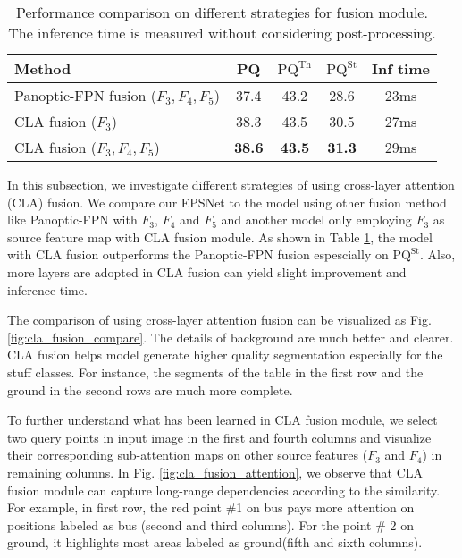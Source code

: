 \documentclass[runningheads]{llncs}
\begin{document}
    
\begin{table}[!tb]
\centering
    \caption{Performance comparison on different strategies for fusion module. The inference time is measured without considering post-processing.}
        \begin{tabular}{l  | c c c c}
    \hline
    Method &   PQ                   & $\text{PQ}^{\text{Th}}$ & $\text{PQ}^{\text{St}}$ & Inf time \\ \hline \hline
         Panoptic-FPN fusion \cite{DeGeus2018a} ($F_3,F_4,F_5$)    & 37.4 & 43.2 & 28.6 & 23ms\\ \hline
         CLA fusion ($F_3$)    & 38.3 & 43.5 & 30.5  & 27ms\\ \hline
        CLA fusion ($F_3,F_4,F_5$)     & \textbf{38.6} & \textbf{43.5} & \textbf{31.3}  & 29ms \\ \hline
    
    \end{tabular}
    \label{table:cla_fusion}
\end{table}



In this subsection, we investigate different strategies of using cross-layer attention (CLA) fusion. We compare our EPSNet to the model using other fusion method like Panoptic-FPN \cite{DeGeus2018a} with $F_3$, $F_4$ and $F_5$ and another model only employing $F_3$ as source feature map with CLA fusion module. 
As shown in Table \ref{table:cla_fusion}, the model with CLA fusion outperforms the Panoptic-FPN fusion espescially on $\text{PQ}^{\text{St}}$. Also, more layers are adopted in CLA fusion can yield slight improvement and inference time.

The comparison of using cross-layer attention fusion can be visualized as Fig. \ref{fig:cla_fusion_compare}. The details of background are much better and clearer. CLA fusion helps model generate higher quality segmentation especially for the stuff classes. For instance, the segments of the table in the first row and the ground in the second rows are much more complete. 


To further understand what has been learned in CLA fusion module, we select two query points in input image in the first and fourth columns and visualize their corresponding sub-attention maps on other source features ($F_3$ and $F_4$) in remaining columns. In Fig. \ref{fig:cla_fusion_attention}, we observe that CLA fusion module can capture long-range dependencies according to the similarity. For example, in first row, the red point \#1 on bus pays more attention on  positions labeled as bus (second and third columns). For the point \# 2 on ground, it highlights most areas labeled as ground(fifth and sixth columns).
\end{document}
